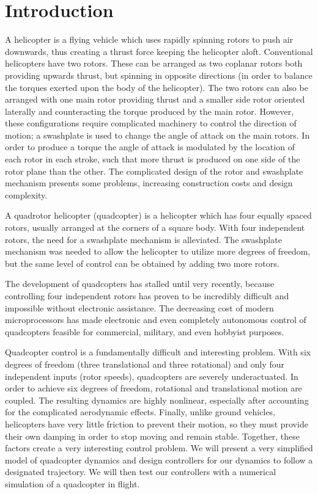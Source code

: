 \documentclass{article}
\author{Andrew Gibiansky}
\date{\today}
\begin{document}
\section*{Introduction}
A helicopter is a flying vehicle which uses rapidly spinning rotors to push air downwards, thus
creating a thrust force keeping the helicopter aloft. Conventional helicopters have two rotors.
These can be arranged as two coplanar rotors both providing upwards thrust, but spinning in opposite
directions (in order to balance the torques exerted upon the body of the helicopter). The two rotors
can also be arranged with one main rotor providing thrust and a smaller side rotor oriented
laterally and counteracting the torque produced by the main rotor. However, these configurations
require complicated machinery to control the direction of motion; a swashplate is used to change the
angle of attack on the main rotors. In order to produce a torque the angle of attack is modulated by
the location of each rotor in each stroke, such that more thrust is produced on one side of the
rotor plane than the other. The complicated design of the rotor and swashplate mechanism presents
some problems, increasing construction costs and design complexity.

A quadrotor helicopter (quadcopter) is a helicopter which has four equally spaced rotors, usually
arranged at the corners of a square body. With four independent rotors, the need for a swashplate
mechanism is alleviated. The swashplate mechanism was needed to allow the helicopter to utilize more
degrees of freedom, but the same level of control can be obtained by adding two more rotors.


The development of quadcopters has stalled until very recently, because controlling four independent
rotors has proven to be incredibly difficult and impossible without electronic assistance. The
decreasing cost of modern microprocessors has made electronic and even completely autonomous control
of quadcopters feasible for commercial, military, and even hobbyist purposes.

Quadcopter control is a fundamentally difficult and interesting problem. With six degrees of freedom
(three translational and three rotational) and only four independent inputs (rotor speeds),
quadcopters are severely underactuated. In order to achieve six degrees of freedom, rotational and
translational motion are coupled. The resulting dynamics are highly nonlinear, especially after
accounting for the complicated aerodynamic effects. Finally, unlike ground
vehicles, helicopters have very little friction to prevent their motion, so they must provide their
own damping in order to stop moving and remain stable. Together, these factors create a very
interesting control problem. We will present a very simplified model of quadcopter dynamics and
design controllers for our dynamics to follow a designated trajectory. We will then test our
controllers with a numerical simulation of a quadcopter in flight.
\end{document}
